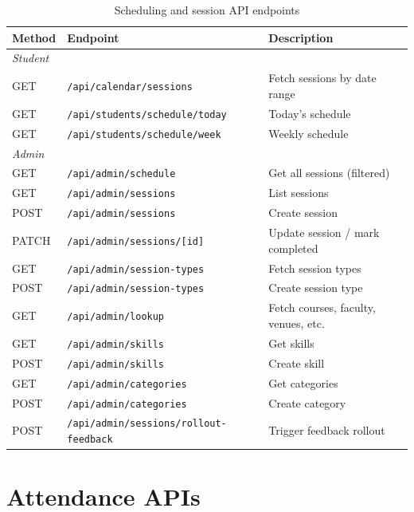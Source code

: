 \begin{table}[!ht]
    \centering
    \begin{tabular}{|l|l|p{5.5cm}|}
    \hline
    \textbf{Method} & \textbf{Endpoint} & \textbf{Description} \\ \hline
    \multicolumn{3}{|l|}{\textit{Student}} \\ \hline
    GET & \texttt{/api/calendar/sessions}          & Fetch sessions by date range \\
    GET & \texttt{/api/students/schedule/today}    & Today's schedule \\
    GET & \texttt{/api/students/schedule/week}     & Weekly schedule \\ \hline
    \multicolumn{3}{|l|}{\textit{Admin}} \\ \hline
    GET   & \texttt{/api/admin/schedule}                  & Get all sessions (filtered) \\
    GET   & \texttt{/api/admin/sessions}                  & List sessions \\
    POST  & \texttt{/api/admin/sessions}                  & Create session \\
    PATCH & \texttt{/api/admin/sessions/[id]}             & Update session / mark completed \\
    GET   & \texttt{/api/admin/session-types}             & Fetch session types \\
    POST  & \texttt{/api/admin/session-types}             & Create session type \\
    GET   & \texttt{/api/admin/lookup}                    & Fetch courses, faculty, venues, etc. \\
    GET   & \texttt{/api/admin/skills}                    & Get skills \\
    POST  & \texttt{/api/admin/skills}                    & Create skill \\
    GET   & \texttt{/api/admin/categories}                & Get categories \\
    POST  & \texttt{/api/admin/categories}                & Create category \\
    POST  & \texttt{/api/admin/sessions/rollout-feedback} & Trigger feedback rollout \\ \hline
    \end{tabular}
    \caption{Scheduling and session API endpoints}
    \label{tab:api_schedule}
\end{table}

\section{Attendance APIs}

